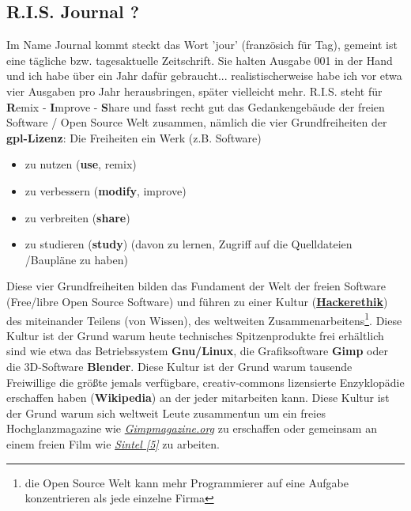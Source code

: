 \subsection*{R.I.S. Journal ?}
Im Name Journal kommt steckt das Wort 'jour' (französich für Tag), gemeint ist eine tägliche bzw. tagesaktuelle Zeitschrift. Sie halten Ausgabe 001 in der Hand und ich habe über ein Jahr dafür gebraucht... realistischerweise habe ich vor etwa vier Ausgaben pro Jahr herausbringen, später vielleicht mehr. R.I.S. steht für \textbf{R}emix - \textbf{I}mprove - \textbf{S}hare und fasst recht gut das Gedankengebäude der freien Software / Open Source Welt zusammen, nämlich die vier Grundfreiheiten der \textbf{gpl-Lizenz}: Die Freiheiten ein Werk (z.B. Software) 
\begin{itemize}
\item zu nutzen (\textbf{use}, remix)
\item zu verbessern (\textbf{modify}, improve)
\item zu verbreiten (\textbf{share})
\item zu studieren (\textbf{study}) (davon zu lernen, Zugriff auf die Quelldateien /Baupläne zu haben)
\end{itemize}

Diese vier Grundfreiheiten bilden das Fundament der Welt der freien Software (Free/libre Open Source Software) und führen zu einer Kultur (\href{http://en.wikipedia.org/wiki/Hacker_ethic}{\textbf{Hackerethik}}) des miteinander Teilens (von Wissen), des weltweiten Zusammenarbeitens\footnote{die Open Source Welt kann mehr Programmierer auf eine Aufgabe konzentrieren als jede einzelne Firma}. Diese Kultur ist der Grund warum heute technisches Spitzenprodukte frei erhältlich sind wie etwa das Betriebssystem \textbf{Gnu/Linux}, die Grafiksoftware \textbf{Gimp} oder die 3D-Software \textbf{Blender}. Diese Kultur ist der Grund warum tausende Freiwillige die größte jemals verfügbare, creativ-commons lizensierte Enzyklopädie erschaffen haben (\textbf{Wikipedia}) an der jeder mitarbeiten kann. Diese Kultur ist der Grund warum sich weltweit Leute zusammentun um ein freies Hochglanzmagazine wie \href{http://gimpmagazine.org/}{\textit{Gimpmagazine.org}} zu erschaffen oder gemeinsam an einem freien Film wie \href{http://www.sintel.org/}{\textit{Sintel [5]}} zu arbeiten. \\

